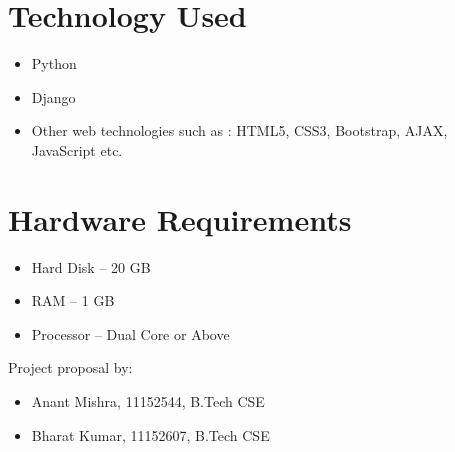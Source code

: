 \documentclass[a4paper]{article}
\begin{document}
\section{Technology Used}

\begin{itemize}
\item Python
\item Django
\item Other web technologies such as : HTML5, CSS3, Bootstrap, AJAX, JavaScript etc. 
\end{itemize}

\section{Hardware Requirements}

\begin{itemize}
\item Hard Disk – 20 GB
\item RAM – 1 GB
\item Processor – Dual Core or Above
\end{itemize}

\bigskip
\baselinestretch Project proposal by:
\begin{itemize}
\item Anant Mishra, 11152544, B.Tech CSE
\item Bharat Kumar, 11152607, B.Tech CSE
\end{itemize}
\end{document}
